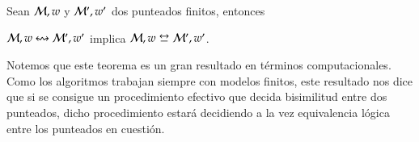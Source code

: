 \begin{teorema}\label{ref:finite-equivalence-implies-bisim}
    Sean $\mathcal{M},w$ y $\mathcal{M}',w'$ dos \ultss punteados finitos, entonces
    \begin{center}
        $\mathcal{M},w \mathrel{\leftrightsquigarrow} \mathcal{M}', w'$ implica $\model,w \bisim \model', w'$.
    \end{center}
\end{teorema}

Notemos que este teorema es un gran resultado en términos computacionales. Como los algoritmos trabajan siempre con modelos finitos, este resultado
nos dice que si se consigue un procedimiento efectivo que decida bisimilitud entre dos \ultss punteados, dicho procedimiento estará decidiendo a la vez
equivalencia lógica entre los \ultss punteados en cuestión.